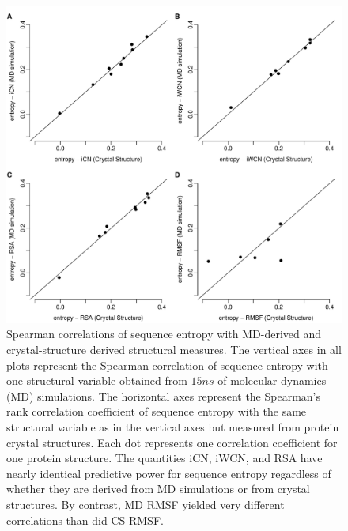 \documentclass[smallextended]{svjour3}
\begin{document}
\begin{figure}[tbh]
\begin{center}
    \includegraphics[width=6.5in]{cor_cr_md.pdf} %
\end{center}
\caption{Spearman correlations of sequence entropy with MD-derived and crystal-structure derived structural measures. The vertical axes in all plots represent the Spearman correlation of sequence entropy with one structural variable obtained from $15ns$ of molecular dynamics (MD) simulations. The horizontal axes represent the Spearman's rank correlation coefficient of sequence entropy with the same structural variable as in the vertical axes but measured from protein crystal structures. Each dot represents one correlation coefficient for one protein structure. The quantities iCN, iWCN, and RSA have nearly identical predictive power for sequence entropy regardless of whether they are derived from MD simulations or from crystal structures. By contrast, MD RMSF yielded very different correlations than did CS RMSF.}
\label{fig:cor_cr_md}
\end{figure}
\end{document}
